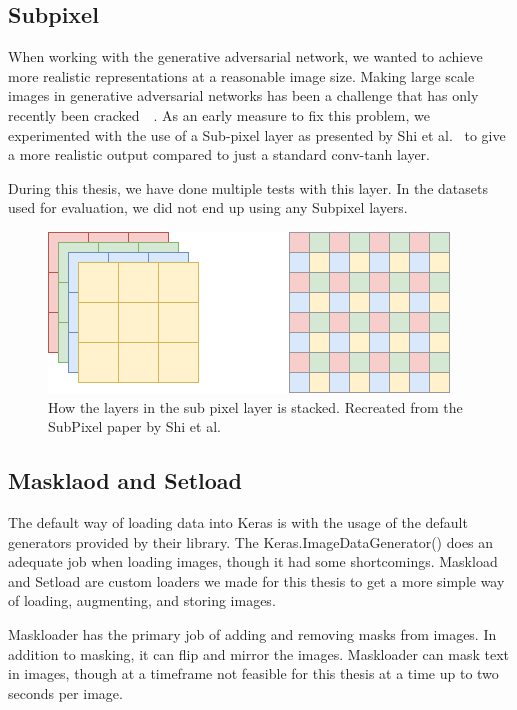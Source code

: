 \subsection{Subpixel}
When working with the generative adversarial network, we wanted to achieve more realistic representations at a reasonable image size. 
Making large scale images in generative adversarial networks has been a challenge that has only recently been cracked~\cite{DBLP:journals/corr/DentonCSF15}~\cite{DBLP:journals/corr/abs-1809-11096}.
As an early measure to fix this problem, we experimented with the use of a Sub-pixel layer as presented by Shi et al.~\cite{DBLP:journals/corr/ShiCHTABRW16} to give a more realistic output compared to just a standard conv-tanh layer.

During this thesis, we have done multiple tests with this layer. In the datasets used for evaluation, we did not end up using any Subpixel layers.

\begin{figure}[b]
\centering
\includegraphics[scale=0.8]{methodology/figures/SubPixel.png}
\caption{How the layers in the sub pixel layer is stacked. Recreated from the SubPixel paper by Shi et al.~\cite{DBLP:journals/corr/ShiCHTABRW16}}
\label{fig:SubPixel}
\end{figure}


\subsection{Masklaod and Setload}
The default way of loading data into Keras is with the usage of the default generators provided by their library. The Keras.ImageDataGenerator() does an adequate job when loading images, though it had some shortcomings.
Maskload and Setload are custom loaders we made for this thesis to get a more simple way of loading, augmenting, and storing images.

Maskloader has the primary job of adding and removing masks from images. In addition to masking, it can flip and mirror the images. Maskloader can mask text in images, though at a timeframe not feasible for this thesis at a time up to two seconds per image. 

